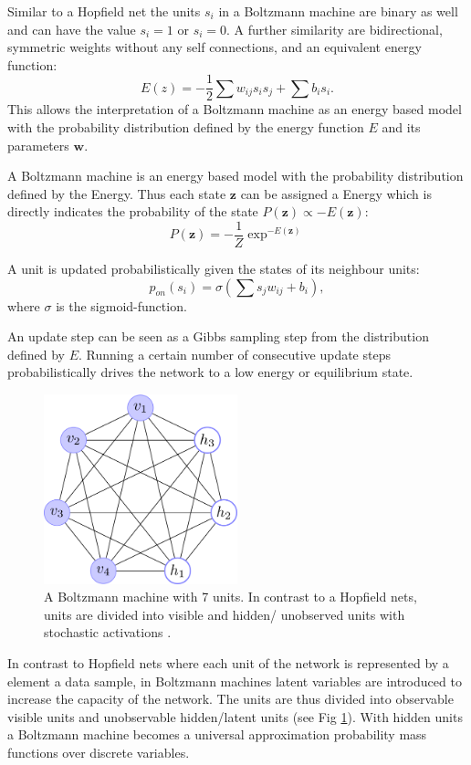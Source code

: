 Similar to a Hopfield net the units $s_i$ in a Boltzmann machine are binary as well and can have the value $s_i = 1$ or $s_i = 0$. 
A further similarity are bidirectional, symmetric weights without any self connections, and an equivalent energy function:
\[
	E(z) = - \frac{1}{2} \sum w_{ij} s_i s_j + \sum b_i s_i .
\]
This allows the interpretation of a Boltzmann machine as an energy based model with the probability distribution defined by the energy function $E$ and its parameters $\textbf{w}$.

A Boltzmann machine is an energy based model with the probability distribution defined by the Energy.
Thus each state $\textbf{z}$ can be assigned a Energy which is directly indicates the probability of the state $P(\textbf{z}) \propto -E(\textbf{z})$:
\[
P(\textbf{z}) = - \frac{1}{Z} \exp^{-E(\textbf{z})} 
\]

A unit is updated probabilistically given the states of its neighbour units:
\[
p_{on}(s_i) = \sigma( \sum s_j w_{ij} + b_i ), 
\]
where $\sigma$ is the sigmoid-function.

An update step can be seen as a Gibbs sampling step from the distribution defined by $E$.
Running a certain number of consecutive update steps probabilistically drives the network to a low energy or equilibrium state.


\begin{figure}
	\centering
    	\includegraphics[width=0.5\textwidth]{imgs/bm.png} 
    \caption{A Boltzmann machine with 7 units. In contrast to a Hopfield nets, units are divided into visible and hidden/ unobserved units with stochastic activations \cite{boltzImg}.}
	\label{fig:bm}
\end{figure}

In contrast to Hopfield nets where each unit of the network is represented by a element a data sample, in Boltzmann machines latent variables are introduced to increase the capacity of the network.
The units are thus divided into observable visible units and unobservable hidden/latent units (see Fig \ref{fig:bm}).
With hidden units a Boltzmann machine becomes a universal approximation probability mass functions over discrete variables.


